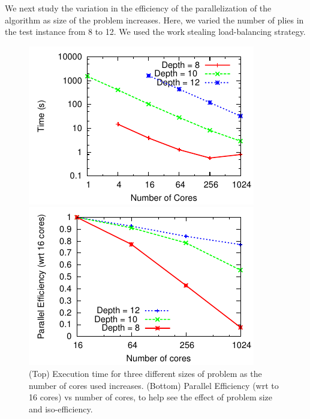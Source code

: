 \documentclass[10pt, conference, compsocconf]{IEEEtran}
\begin{document}
We next study the variation in the efficiency of the parallelization of the
algorithm as size of the problem increases.  Here, we varied the number
of plies in the test instance from 8 to 12. We used the work stealing
load-balancing strategy.  
\begin{figure}[ht] 
\centering
\begin{minipage}{0.7\linewidth}
\includegraphics[width=\columnwidth]{plots/3depths.pdf}
\end{minipage}
\centering
\begin{minipage}{0.7\linewidth}
\includegraphics[width=\columnwidth]{plots/3depthspe.pdf}
\end{minipage}
\caption{(Top) Execution time for three different sizes of problem as the number of cores used increases.
(Bottom) Parallel Efficiency (wrt to 16 cores) vs number of cores, to help see the effect of problem size and iso-efficiency.}
\label{3depths}
\vspace{-0.3in}
\end{figure}
\end{document}
